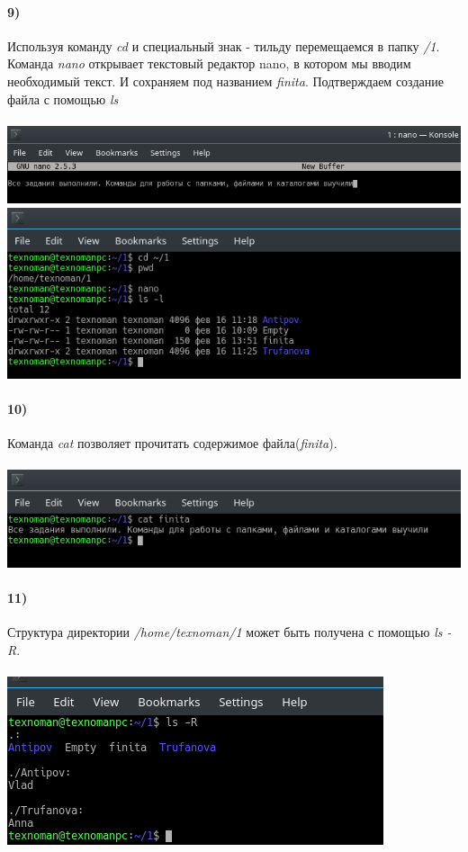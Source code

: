 	\paragraph{9)}
	Используя команду \textit{cd} и специальный знак - тильду перемещаемся в папку \textit{/1}. 
	Команда \textit{nano} открывает текстовый редактор nano,  в котором мы вводим необходимый текст. И сохраняем под названием \textit{finita}. Подтверждаем создание файла с помощью \textit{ls}\\
	\\
	\includegraphics[width=\textwidth]{11.png}
	\\
	\includegraphics[width=\textwidth]{12.png}
	\\

	\paragraph{10)}
	Команда \textit{cat} позволяет прочитать содержимое файла(\textit{finita}).\\
	\\
	\includegraphics[width=\textwidth]{13.png}
	\\
	
	\paragraph{11)}
	Структура директории \textit{/home/texnoman/1} может быть получена с помощью \textit{ls -R}.\\
	\\
	\includegraphics[width=\textwidth]{14.png}
